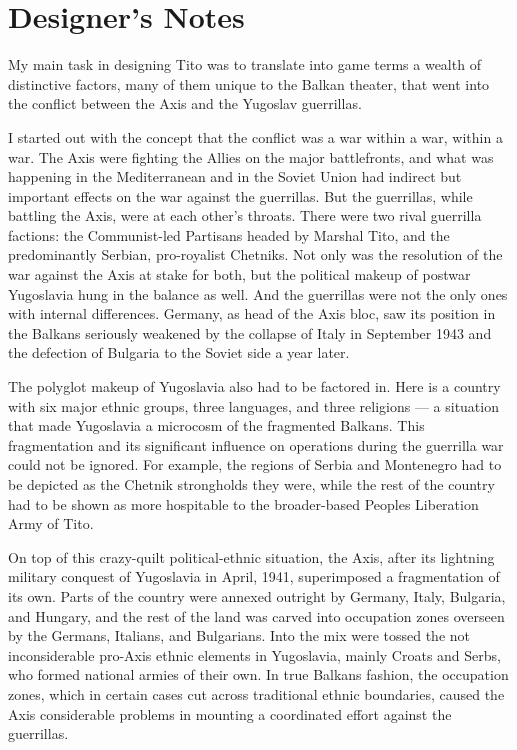 \section{Designer’s Notes}
My main task in designing Tito was to translate into game terms a wealth of distinctive factors, many of them unique to the Balkan theater, that went into the conflict between the Axis and the Yugoslav guerrillas.

I started out with the concept that the conflict was a war within a war, within a war. The Axis were fighting the Allies on the major battlefronts, and what was happening in the Mediterranean and in the Soviet Union had indirect but important effects on the war against the guerrillas. But the guerrillas, while battling the Axis, were at each other’s throats. There were two rival guerrilla factions: the Communist-led Partisans headed by Marshal Tito, and the predominantly Serbian, pro-royalist Chetniks. Not only was the resolution of the war against the Axis at stake for both, but the political makeup of postwar Yugoslavia hung in the balance as well. And the guerrillas were not the only ones with internal differences. Germany, as head of the Axis bloc, saw its position in the Balkans seriously weakened by the collapse of Italy in September 1943 and the defection of Bulgaria to the Soviet side a year later.

The polyglot makeup of Yugoslavia also had to be factored in. Here is a country with six major ethnic groups, three languages, and three religions — a situation that made Yugoslavia a microcosm of the fragmented Balkans. This fragmentation and its significant influence on operations during the guerrilla war could not be ignored. For example, the regions of Serbia and Montenegro had to be depicted as the Chetnik strongholds they were, while the rest of the country had to be shown as more hospitable to the broader-based Peoples Liberation Army of Tito.

On top of this crazy-quilt political-ethnic situation, the Axis, after its lightning military conquest of Yugoslavia in April, 1941, superimposed a fragmentation of its own. Parts of the country were annexed outright by Germany, Italy, Bulgaria, and Hungary, and the rest of the land was carved into occupation zones overseen by the Germans, Italians, and Bulgarians. Into the mix were tossed the not inconsiderable pro-Axis ethnic elements in Yugoslavia, mainly Croats and Serbs, who formed national armies of their own. In true Balkans fashion, the occupation zones, which in certain cases cut across traditional ethnic boundaries, caused the Axis considerable problems in mounting a coordinated effort against the guerrillas.

